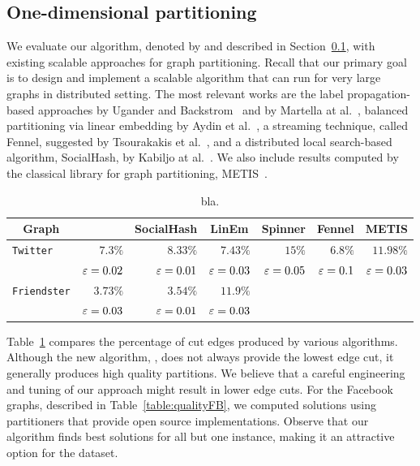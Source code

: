 \subsection{One-dimensional partitioning}
We evaluate our algorithm, denoted by \algnameshort and described in Section~\ref{}, with existing scalable approaches for graph partitioning. Recall that our primary goal is to design and implement a scalable algorithm that can run for very large graphs in distributed setting.
The most relevant works are the label propagation-based approaches by Ugander and Backstrom~\cite{UB13} and by Martella at al.~\cite{MLLS17}, balanced partitioning via linear embedding by Aydin et al.~\cite{ABM16}, a streaming technique, called Fennel, suggested by Tsourakakis et al.~\cite{TGRV14}, and a distributed local search-based algorithm, SocialHash, by Kabiljo at al.~\cite{SH16,KKPPSAP17}. We also include results computed by the classical library for graph partitioning, METIS~\cite{KK95}.

\begin{table}[!h]
	\centering
	\begin{tabular}{lrrrrrr}\toprule
		\multicolumn{1}{c}{Graph} & \multicolumn{1}{c}{\algnameshort} %
		& \multicolumn{1}{c}{SocialHash} & \multicolumn{1}{c}{LinEm} & \multicolumn{1}{c}{Spinner} & \multicolumn{1}{c}{Fennel} & \multicolumn{1}{c}{METIS} \\
		\midrule
		\texttt{Twitter}
		& $7.3\%$ & $8.33\%$ & $7.43\%$ & $15\%$ & $\boldsymbol{6.8\%}$ & $11.98\%$ \\
		& $\varepsilon=0.02$ & $\varepsilon=0.01$ & $\varepsilon=0.03$ & $\varepsilon=0.05$ & $\varepsilon=0.1$ &$\varepsilon=0.03$ \\
		\midrule
		\texttt{Friendster}
		& $3.73\%$ & $\boldsymbol{3.54\%}$ & $11.9\%$ &  &  &  \\
		& $\varepsilon=0.03$ & $\varepsilon=0.01$ & $\varepsilon=0.03$ &  &  &  \\
		\bottomrule
	\end{tabular}
	\vspace{0.1cm}
	\caption{bla.}
	\label{table:quality}
\end{table}

Table~\ref{table:quality} compares the percentage of cut edges produced by various algorithms. Although the new 
algorithm, \algnameshort, does not always provide the lowest edge cut, it generally produces high quality partitions. 
We believe that a careful engineering and tuning of our approach might result in lower edge cuts.
For the Facebook graphs, described in Table~\ref{table:qualityFB}, we computed solutions using partitioners
that provide open source implementations. Observe that our algorithm
finds best solutions for all but one instance, making it an attractive option for the dataset. 

